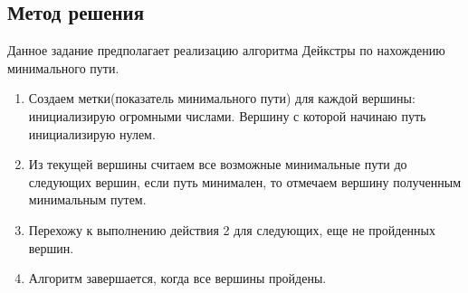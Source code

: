 \documentclass[12pt]{article}
\begin{document}
\subsection*{Метод решения}
Данное задание предполагает реализацию алгоритма Дейкстры по нахождению минимального пути.
\begin{enumerate}
\item Создаем метки(показатель минимального пути) для каждой вершины: инициализирую огромными числами. Вершину с которой начинаю путь инициализирую нулем.
\item Из текущей вершины считаем все возможные минимальные пути до следующих вершин, если путь минимален, то отмечаем вершину полученным минимальным путем.
\item Перехожу к выполнению действия 2 для следующих, еще не пройденных вершин.
\item Алгоритм завершается, когда все вершины пройдены.
\end{enumerate}
\end{document}
